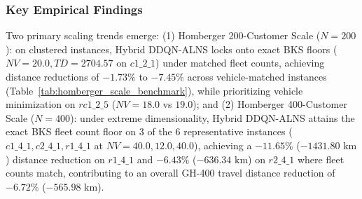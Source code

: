 \documentclass{ieeeaccess}
\begin{document}
\subsubsection{Key Empirical Findings}
Two primary scaling trends emerge: (1) Homberger 200-Customer Scale ($N=200$): on clustered instances, Hybrid DDQN-ALNS locks onto exact BKS floors ($NV=20.0, TD=2704.57$ on $c1\_2\_1$) under matched fleet counts, achieving distance reductions of $-1.73\%$ to $-7.45\%$ across vehicle-matched instances (Table~\ref{tab:homberger_scale_benchmark}), while prioritizing vehicle minimization on $rc1\_2\_5$ ($NV=18.0$ vs $19.0$); and (2) Homberger 400-Customer Scale ($N=400$): under extreme dimensionality, Hybrid DDQN-ALNS attains the exact BKS fleet count floor on 3 of the 6 representative instances ($c1\_4\_1, c2\_4\_1, r1\_4\_1$ at $NV=40.0, 12.0, 40.0$), achieving a $-11.65\%$ ($-1431.80\text{ km}$) distance reduction on $r1\_4\_1$ and $-6.43\%$ ($-636.34\text{ km}$) on $r2\_4\_1$ where fleet counts match, contributing to an overall GH-400 travel distance reduction of $-6.72\%$ ($-565.98\text{ km}$).
\end{document}
